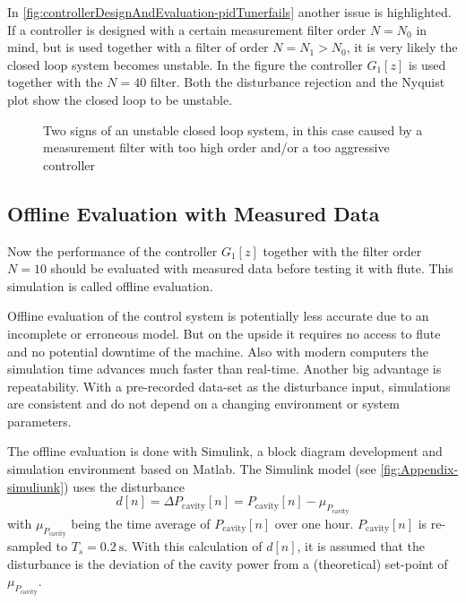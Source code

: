 In \autoref{fig:controllerDesignAndEvaluation-pidTunerfails} another issue is highlighted. If a controller is designed with a certain measurement filter order $N=N_0$ in mind, but is used together with a filter of order $N=N_1>N_0$, it is very likely the closed loop system becomes unstable. In the figure the controller $G_1[z]$ is used together with the $N=40$ filter. Both the disturbance rejection and the Nyquist plot show the closed loop to be unstable.

\begin{figure}[tb]
    \centering
        \qquad
       \caption[Unstable system]{Two signs of an unstable closed loop system, in this case caused by a measurement filter with too high order and/or a too aggressive controller}
    \label{fig:controllerDesignAndEvaluation-pidTunerfails}
\end{figure}


\subsection{Offline Evaluation with Measured Data}
Now the performance of the controller $G_1[z]$ together with the filter order $N=10$ should be evaluated with measured data before testing it with \gls{flute}. This simulation is called offline evaluation.

Offline evaluation of the control system is potentially less accurate due to an incomplete or erroneous model. But on the upside it requires no access to \gls{flute} and no potential downtime of the machine. Also with modern computers the simulation time advances much faster than real-time. Another big advantage is repeatability. With a pre-recorded data-set as the disturbance input, simulations are consistent and do not depend on a changing environment or system parameters.

The offline evaluation is done with Simulink, a block diagram development and simulation environment based on Matlab. The Simulink model (see \autoref{fig:Appendix-simuliunk}) uses the disturbance
\begin{equation}
d[n] = \Delta P_\text{cavity}[n] = P_\text{cavity}[n] - \mu_{P_\text{cavity}}
\end{equation}
with $\mu_{P_\text{cavity}}$ being the time average of $P_\text{cavity}[n]$ over one hour. $P_\text{cavity}[n]$ is re-sampled to $T_s=\SI{0.2}{\second}$.
With this calculation of $d[n]$, it is assumed that the disturbance is the deviation of the cavity power from a (theoretical) set-point of $\mu_{P_\text{cavity}}$.

